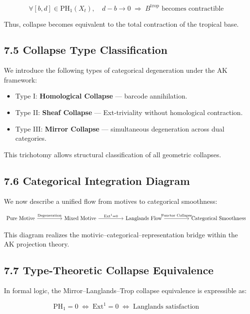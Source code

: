 \documentclass[11pt]{article}
\begin{document}
\[
\forall [b,d] \in \mathrm{PH}_1(X_t), \quad d - b \to 0 \;\Rightarrow\; B^{\mathrm{trop}} \text{ becomes contractible}
\]

Thus, collapse becomes equivalent to the total contraction of the tropical base.

\subsection*{7.5 Collapse Type Classification}

We introduce the following types of categorical degeneration under the AK framework:

\begin{itemize}
  \item Type I: \textbf{Homological Collapse} — barcode annihilation.
  \item Type II: \textbf{Sheaf Collapse} — Ext-triviality without homological contraction.
  \item Type III: \textbf{Mirror Collapse} — simultaneous degeneration across dual categories.
\end{itemize}

This trichotomy allows structural classification of all geometric collapses.

\subsection*{7.6 Categorical Integration Diagram}

We now describe a unified flow from motives to categorical smoothness:

\[
\begin{tikzcd}[column sep=huge, row sep=large]
\text{Pure Motive} \arrow[r, "\text{Degeneration}"]
& \text{Mixed Motive} \arrow[r, "\mathrm{Ext}^1 = 0"]
& \text{Langlands Flow} \arrow[r, "\text{Functor Collapse}"]
& \text{Categorical Smoothness}
\end{tikzcd}
\]

This diagram realizes the motivic–categorical–representation bridge within the AK projection theory.

\subsection*{7.7 Type-Theoretic Collapse Equivalence}

In formal logic, the Mirror–Langlands–Trop collapse equivalence is expressible as:

\[
\text{PH}_1 = 0 \;\Leftrightarrow\; \mathrm{Ext}^1 = 0 \;\Leftrightarrow\; \text{Langlands satisfaction}
\]
\end{document}
